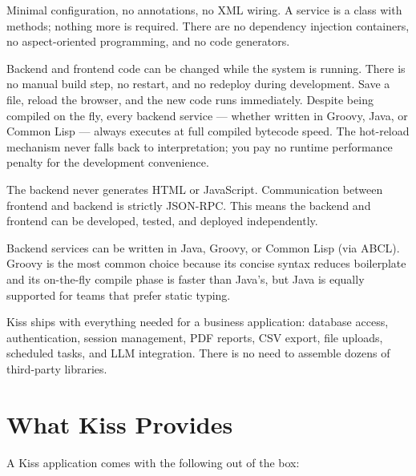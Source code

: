 \begin{description}[style=nextline]
  \item[Simplicity] Minimal configuration, no annotations, no XML wiring.  A service is a class with methods; nothing more is required.  There are no dependency injection containers, no aspect-oriented programming, and no code generators.

  \item[Hot Reload] Backend and frontend code can be changed while the system is running.  There is no manual build step, no restart, and no redeploy during development.  Save a file, reload the browser, and the new code runs immediately.  Despite being compiled on the fly, every backend service --- whether written in Groovy, Java, or Common Lisp --- always executes at full compiled bytecode speed.  The hot-reload mechanism never falls back to interpretation; you pay no runtime performance penalty for the development convenience.

  \item[Clean Separation] The backend never generates HTML or JavaScript.  Communication between frontend and backend is strictly JSON-RPC.  This means the backend and frontend can be developed, tested, and deployed independently.

  \item[Multi-Language Services] Backend services can be written in Java, Groovy, or Common Lisp (via ABCL).  Groovy is the most common choice because its concise syntax reduces boilerplate and its on-the-fly compile phase is faster than Java's, but Java is equally supported for teams that prefer static typing.

  \item[Completeness] Kiss ships with everything needed for a business application: database access, authentication, session management, PDF reports, CSV export, file uploads, scheduled tasks, and LLM integration.  There is no need to assemble dozens of third-party libraries.
\end{description}

\section{What Kiss Provides}
\label{sec:intro-provides}

A Kiss application comes with the following out of the box:

